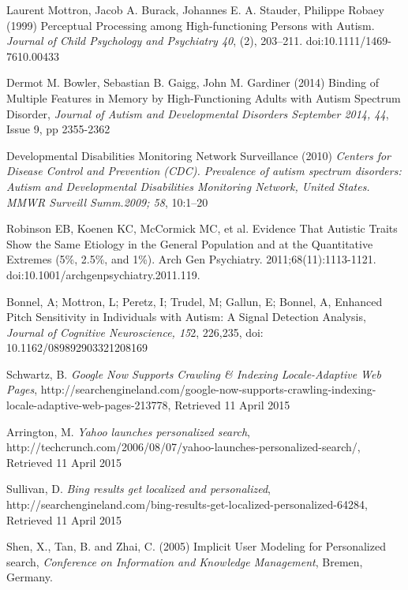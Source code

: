 \documentclass[a4paper, 10pt]{article}
\begin{document}
\clearpage
\begin{thebibliography}{100}

 Laurent Mottron, Jacob A. Burack, Johannes E. A. Stauder, Philippe Robaey (1999) Perceptual Processing among High-functioning Persons with Autism. \textit{Journal of Child Psychology and Psychiatry 40}, (2), 203–211. doi:10.1111/1469-7610.00433

Dermot M. Bowler, Sebastian B. Gaigg, John M. Gardiner (2014) Binding of Multiple Features in Memory by High-Functioning Adults with Autism Spectrum Disorder, \textit{Journal of Autism and Developmental Disorders September 2014, 44}, Issue 9, pp 2355-2362

Developmental Disabilities Monitoring Network Surveillance (2010) \textit{Centers for Disease Control and Prevention (CDC). Prevalence of autism spectrum disorders: Autism and Developmental Disabilities Monitoring Network, United States. MMWR Surveill Summ.2009; 58}, 10:1–20

 Robinson EB, Koenen KC, McCormick MC, et al. Evidence That Autistic Traits Show the Same Etiology in the General Population and at the Quantitative Extremes (5\%, 2.5\%, and 1\%). Arch Gen Psychiatry. 2011;68(11):1113-1121. doi:10.1001/archgenpsychiatry.2011.119.

 Bonnel, A; Mottron, L; Peretz, I; Trudel, M; Gallun, E; Bonnel, A, Enhanced Pitch Sensitivity in Individuals with Autism: A Signal Detection Analysis, \textit{Journal of Cognitive Neuroscience, 15}2, 226,235, doi: 10.1162/089892903321208169

Schwartz, B. \textit{Google Now Supports Crawling \& Indexing Locale-Adaptive Web Pages}, http://searchengineland.com/google-now-supports-crawling-indexing-locale-adaptive-web-pages-213778, Retrieved 11 April 2015

Arrington, M. \textit{Yahoo launches personalized search}, http://techcrunch.com/2006/08/07/yahoo-launches-personalized-search/, Retrieved 11 April 2015

Sullivan, D. \textit{Bing results get localized and personalized}, http://searchengineland.com/bing-results-get-localized-personalized-64284, Retrieved 11 April 2015

Shen, X., Tan, B. and Zhai, C. (2005) Implicit User Modeling for Personalized search, \textit{Conference on Information and Knowledge Management}, Bremen, Germany.


\end{thebibliography}
\end{document}
